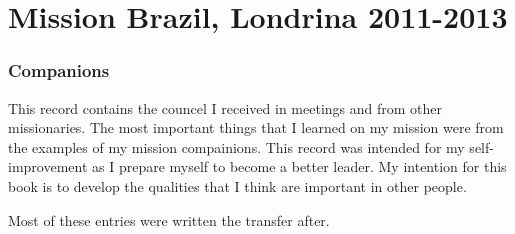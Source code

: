 \newpage

\part{Mission Brazil, Londrina 2011-2013}
\section{Companions}
This record contains the councel I received in meetings and from other missionaries. The most important things that I learned on my mission were from the examples of my mission compainions.  This record was intended for my self-improvement as I prepare myself to become a better leader.  My intention for this book is to develop the qualities that I think are important in other people.  

Most of these entries were written the transfer after.  

